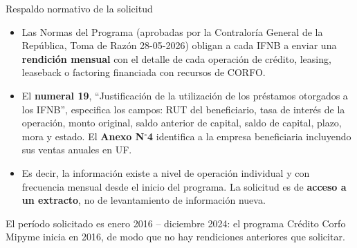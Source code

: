 \documentclass[aspectratio=169]{beamer}
\begin{document}
\begin{frame}{Respaldo normativo de la solicitud}
\begin{itemize}
    \item Las Normas del Programa (aprobadas por la Contraloría General de la República, Toma de Razón 28-05-2026) obligan a cada IFNB a enviar una \textbf{rendición mensual} con el detalle de cada operación de crédito, leasing, leaseback o factoring financiada con recursos de CORFO.
    \item El \textbf{numeral 19}, ``Justificación de la utilización de los préstamos otorgados a los IFNB'', especifica los campos: RUT del beneficiario, tasa de interés de la operación, monto original, saldo anterior de capital, saldo de capital, plazo, mora y estado. El \textbf{Anexo N$^\circ$4} identifica a la empresa beneficiaria incluyendo sus ventas anuales en UF.
    \item Es decir, la información existe a nivel de operación individual y con frecuencia mensual desde el inicio del programa. La solicitud es de \textbf{acceso a un extracto}, no de levantamiento de información nueva.
\end{itemize}

\vspace{0.2cm}
\footnotesize El período solicitado es enero 2016 -- diciembre 2024: el programa Crédito Corfo Mipyme inicia en 2016, de modo que no hay rendiciones anteriores que solicitar.
\end{frame}
\end{document}
